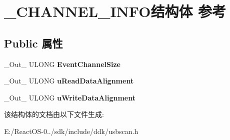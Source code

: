 \hypertarget{struct___c_h_a_n_n_e_l___i_n_f_o}{}\section{\+\_\+\+C\+H\+A\+N\+N\+E\+L\+\_\+\+I\+N\+F\+O结构体 参考}
\label{struct___c_h_a_n_n_e_l___i_n_f_o}
\subsection*{Public 属性}
\begin{DoxyCompactItemize}
\item 
\mbox{\label{struct___c_h_a_n_n_e_l___i_n_f_o_ab58ab2c1ab20b6230e7e6fae474153d7}} 
\+\_\+\+Out\+\_\+ U\+L\+O\+NG {\bfseries Event\+Channel\+Size}
\item 
\mbox{\label{struct___c_h_a_n_n_e_l___i_n_f_o_ad05f0512fbd1949742e38327f71faac1}} 
\+\_\+\+Out\+\_\+ U\+L\+O\+NG {\bfseries u\+Read\+Data\+Alignment}
\item 
\mbox{\label{struct___c_h_a_n_n_e_l___i_n_f_o_a03c4ee716b05de3686625223a6c7b9e5}} 
\+\_\+\+Out\+\_\+ U\+L\+O\+NG {\bfseries u\+Write\+Data\+Alignment}
\end{DoxyCompactItemize}


该结构体的文档由以下文件生成\+:\begin{DoxyCompactItemize}
\item 
E\+:/\+React\+O\+S-\/0../sdk/include/ddk/usbscan.\+h\end{DoxyCompactItemize}

